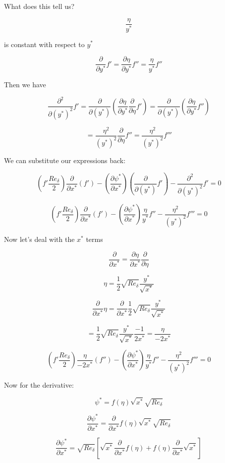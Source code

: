 \documentclass[11pt]{article}
\begin{document}
What does this tell us?

$$\frac{\eta}{y^*}$$

is constant with respect to $y^*$


$$\frac{\partial}{\partial y^*} f' = \frac{\partial \eta}{\partial y^*}f'' = \frac{\eta}{y^*}f''$$

Then we have

$$\frac{\partial^2}{\partial (y^*)^2} f' = \frac{\partial}{\partial (y^*)}(\frac{\partial \eta}{\partial y^*} \frac{\partial}{\partial \eta} f') = \frac{\partial}{\partial (y^*)}(\frac{\partial \eta}{\partial y^*} f'') $$

$$= \frac{\eta^2}{(y^*)^2} \frac{\partial}{\partial \eta} f'' = \frac{\eta^2}{(y^*)^2}f'''$$

We can substitute our expressions back:


$$  (f' \frac{Re_\delta}{2})  \frac{\partial}{\partial x^* } (f' ) - (\frac{\partial \psi^*}{\partial x^*})  (\frac{\partial }{\partial (y^*)} f' ) - \frac{\partial^2}{\partial (y^*)^2} f'  =  0$$


$$  (f' \frac{Re_\delta}{2})  \frac{\partial}{\partial x^* } (f' ) - (\frac{\partial \psi^*}{\partial x^*})  \frac{\eta}{y^*}f'' - \frac{\eta^2}{(y^*)^2}f'''  =  0$$

Now let's deal with the $x^*$ terms

$$\frac{\partial}{\partial x^*} = \frac{\partial \eta}{\partial x^*}\frac{\partial}{\partial \eta}$$

$$\eta = \frac{1}{2} \sqrt{Re_\delta} \frac{y^*}{\sqrt{x^*}}  $$

$$ \frac{\partial}{\partial x^*} \eta =  \frac{\partial}{\partial x^*}\frac{1}{2} \sqrt{Re_\delta} \frac{y^*}{\sqrt{x^*}}  $$

$$ = \frac{1}{2} \sqrt{Re_\delta} \frac{y^*}{\sqrt{x^*}} \frac{-1}{2x^*} = \frac{\eta}{-2x^*} $$

$$  (f' \frac{Re_\delta}{2}) \frac{\eta}{-2x^*} (f'' ) - (\frac{\partial \psi^*}{\partial x^*})  \frac{\eta}{y^*}f'' - \frac{\eta^2}{(y^*)^2}f'''  =  0$$

Now for the derivative:

$$\psi^* = f(\eta) \sqrt{x^*} \sqrt{Re_\delta}$$

$$\frac{\partial \psi^*}{\partial x^*} = \frac{\partial }{\partial x^*} f(\eta) \sqrt{x^*} \sqrt{Re_\delta}$$

$$\frac{\partial \psi^*}{\partial x^*} = \sqrt{Re_\delta}[ \sqrt{x^*} \frac{\partial }{\partial x^*} f(\eta)  + f(\eta)\frac{\partial }{\partial x^*}  \sqrt{x^*} ]$$
\end{document}
